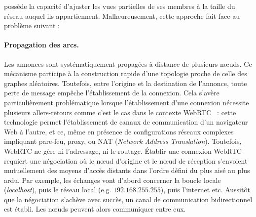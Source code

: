 \SCAMP possède la capacité d'ajuster les vues partielles de ses membres à la
taille du réseau auquel ils appartiennent. Malheureusement, cette approche fait
face au problème suivant :

\paragraph{Propagation des arcs.} Les annonces sont systématiquement propagées à
distance de plusieurs nœuds. Ce mécanisme participe à la construction rapide
d'une topologie proche de celle des graphes aléatoires. Toutefois, entre
l'origine et la destination de l'annonce, toute perte de message empêche
l'établissement de la connexion. Cela s'avère particulièrement problématique
lorsque l'établissement d'une connexion nécessite plusieurs allers-retours comme
c'est le cas dans le contexte WebRTC~\cite{webrtc} :
cette technologie permet l'établissement de canaux de communication d'un
navigateur Web à l'autre, et ce, même en présence de configurations réseaux
complexes impliquant pare-feu, proxy, ou NAT (\emph{Network Address
  Translation}). Toutefois, WebRTC ne gère ni l'adressage, ni le routage.
Établir une connexion WebRTC requiert une négociation où le nœud d'origine et le
nœud de réception s'envoient mutuellement des moyens d'accès distants dans
l'ordre défini du plus aisé au plus ardu. Par exemple, les échanges vont d'abord
concerner la boucle locale (\emph{localhost}), puis le réseau local
(e.g. $192.168.255.255$), puis l'internet etc. Aussitôt que la négociation
s'achève avec succès, un canal de communication bidirectionnel est établi. Les
nœuds peuvent alors communiquer entre eux.

